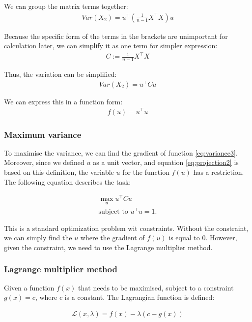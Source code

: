 \documentclass[stu,12pt,floatsintext]{apa7}
\begin{document}
We can group the matrix terms together:
\begin{gather}
    Var(X_2)=u^\top (\frac{1}{n-1}X^\top X)u
\end{gather}

Because the specific form of the terms in the brackets are unimportant for calculation later, we can simplify it as one term for simpler expression:
\begin{gather}
    C:=\frac{1}{n-1}X^\top X
\end{gather}

Thus, the variation can be simplified:
\begin{gather}
    Var(X_2)=u^\top Cu
\end{gather}

We can express this in a function form:
\begin{gather}
    \label{eq:variance3}
    f(u)=u^\top u
\end{gather}

\subsubsection{Maximum variance}

To maximise the variance, we can find the gradient of function \ref{eq:variance3}. Moreover, since we defined $u$ as a unit vector, and equation \ref{eq:projection2} is based on this definition, the variable $u$ for the function $f(u)$ has a restriction. The following equation describes the task:

\begin{gather}
    \max_{u} u^\top C u \\
    \text{subject to } u^\top u = 1.
\end{gather}

This is a standard optimization problem wit constraints. Without the constraint, we can simply find the $u$ where the gradient of $f(u)$ is equal to $0$. However, given the constraint, we need to use the Lagrange multiplier method.

\subsubsection{Lagrange multiplier method}

Given a function $f(x)$ that needs to be maximised, subject to a constraint $g(x)=c$, where $c$ is a constant. The Lagrangian function is defined:

\begin{gather}
     \mathcal{L}(x, \lambda) = f(x) - \lambda(c-g(x))
\end{gather}
   
\end{document}
